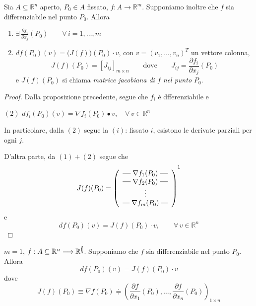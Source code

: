 \begin{cor}
Sia $A \subseteq \mathbb{R}^n$ aperto, $P_0 \in A$ fissato, $f : A \longrightarrow \mathbb{R}^m$. Supponiamo inoltre che $f$ sia differenziabile nel punto $P_0$. Allora
\begin{enumerate}[labelindent=\parindent,leftmargin=*,label=\textnormal{(\roman*)},start=1]
\item $\displaystyle \exists \, \frac{\partial f_i}{\partial x_j} (P_0) \qquad \forall \, i=1,\ldots,m$
\item $df(P_0)(v) = \Big(J(f)\Big)(P_0) \cdot v$, con $v=(v_1,\ldots,v_n)^T$ un vettore colonna,
$$
J(f)(P_0) = \left[ J_{ij} \right]_{m \times n} \qquad \text{dove} \qquad J_{ij} = \frac{\partial f_i}{\partial x_j} (P_0)
$$
e $J(f)(P_0)$ si chiama \emph{matrice jacobiana di $f$ nel punto $P_0$}.
\end{enumerate}
\end{cor}
\begin{proof}
Dalla proposizione precedente, segue che $f_i$ è dfferenziabile e 
\begin{center}
$\mathrm{(2)}$
\hfill
$\displaystyle df_i(P_0)(v) = \nabla f_i(P_0) \bullet v, \quad \forall \, v \in \mathbb{R}^n$
\hfill \null \\
\end{center}
In particolare, dalla $(2)$ segue la $(i)$: fissato $i$, esistono le derivate parziali per ogni $j$.

D'altra parte, da $(1)+(2)$ segue che
$$
J(f)(P_0) = \left(
\begin{array}{c}
\Rigaln{\nabla f_1 (P_0)}\\
\Rigaln{\nabla f_2 (P_0)}\\
\vdots\\
\Rigaln{\nabla f_m (P_0)}\\
\end{array} \right)
^{\footnotemark}
$$
e
$$
df(P_0)(v) = J(f)(P_0) \cdot v, \qquad \forall \, v \in \mathbb{R}^n
$$
\end{proof}

\begin{example}
$m=1$, $f : A \subseteq \mathbb{R}^n \longrightarrow \mathbb{R}^{\xcancel{1}}$. Supponiamo che $f$ sia differenziabile nel punto $P_0$. Allora
$$
df(P_0)(v) = J(f)(P_0) \cdot v
$$
dove
$$
J(f)(P_0) \equiv \nabla f(P_0) \doteqdot \left( \frac{\partial f}{\partial x_1}(P_0), \ldots ,\frac{\partial f}{\partial x_n}(P_0) \right)_{1 \times n}
$$
\end{example}

